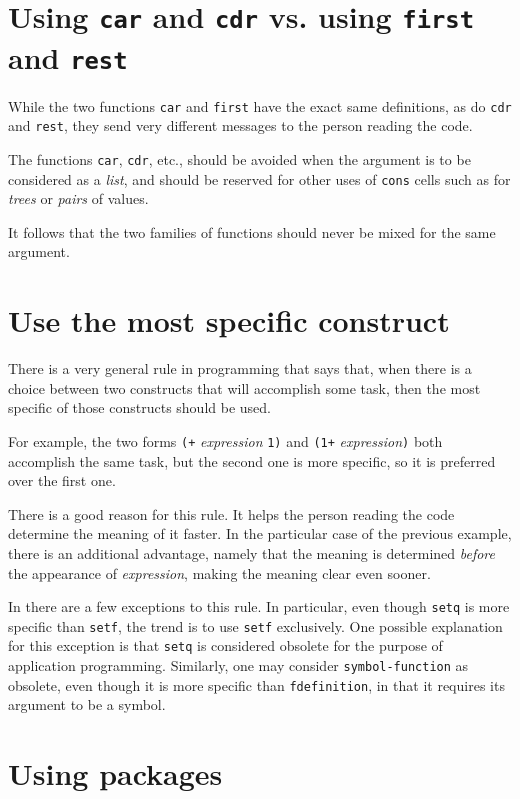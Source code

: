 \section{Using \texttt{car} and \texttt{cdr} vs. using \texttt{first}
  and \texttt{rest}}

While the two functions \texttt{car} and \texttt{first} have the exact
same definitions, as do \texttt{cdr} and \texttt{rest}, they send very
different messages to the person reading the code.

The functions \texttt{car}, \texttt{cdr}, etc., should be avoided when
the argument is to be considered as a \emph{list}, and should be
reserved for other uses of \texttt{cons} cells such as for
\emph{trees} or \emph{pairs} of values.

It follows that the two families of functions should never be mixed
for the same argument.

\section{Use the most specific construct}

There is a very general rule in programming that says that, when there
is a choice between two constructs that will accomplish some task,
then the most specific of those constructs should be used.

For example, the two forms \texttt{(+} \textit{expression} \texttt{1)}
and \texttt{(1+} \textit{expression}\texttt{)} both accomplish the
same task, but the second one is more specific, so it is preferred over
the first one.

There is a good reason for this rule.  It helps the person reading the
code determine the meaning of it faster.  In the particular case of
the previous example, there is an additional advantage, namely that
the meaning is determined \emph{before} the appearance of
\textit{expression}, making the meaning clear even sooner.

In \commonlisp{} there are a few exceptions to this rule. In
particular, even though \texttt{setq} is more specific than
\texttt{setf}, the trend is to use \texttt{setf} exclusively.  One
possible explanation for this exception is that \texttt{setq} is
considered obsolete for the purpose of application programming.
Similarly, one may consider \texttt{symbol-function} as obsolete, even
though it is more specific than \texttt{fdefinition}, in that it
requires its argument to be a symbol.

\section{Using packages}
\label{sec-coding-style-using-packages}

